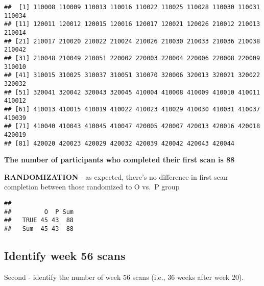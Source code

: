 \documentclass[]{article}
\newenvironment{Shaded}{\begin{snugshade}}{\end{snugshade}}
\newcommand{\KeywordTok}[1]{\textcolor[rgb]{0.13,0.29,0.53}{\textbf{#1}}}
\newcommand{\StringTok}[1]{\textcolor[rgb]{0.31,0.60,0.02}{#1}}
\newcommand{\CommentTok}[1]{\textcolor[rgb]{0.56,0.35,0.01}{\textit{#1}}}
\newcommand{\OperatorTok}[1]{\textcolor[rgb]{0.81,0.36,0.00}{\textbf{#1}}}
\newcommand{\NormalTok}[1]{#1}
\theoremstyle{definition}
\theoremstyle{definition}
\theoremstyle{definition}
\theoremstyle{remark}
\begin{document}
\begin{verbatim}
##  [1] 110008 110009 110013 110016 110022 110025 110028 110030 110031 110034
## [11] 120011 120012 120015 120016 120017 120021 120026 210012 210013 210014
## [21] 210017 210020 210022 210024 210026 210030 210033 210036 210038 210042
## [31] 210048 210049 210051 220002 220003 220004 220006 220008 220009 310010
## [41] 310015 310025 310037 310051 310070 320006 320013 320021 320022 320032
## [51] 320041 320042 320043 320045 410004 410008 410009 410010 410011 410012
## [61] 410013 410015 410019 410022 410023 410029 410030 410031 410037 410039
## [71] 410040 410043 410045 410047 420005 420007 420013 420016 420018 420019
## [81] 420020 420023 420029 420032 420039 420042 420043 420044
\end{verbatim}

\textbf{The number of participants who completed their first scan is 88}

\textbf{RANDOMIZATION} - as expected, there's no difference in first
scan completion between those randomized to O vs.~P group

\begin{Shaded}
\end{Shaded}

\begin{verbatim}
##       
##         O  P Sum
##   TRUE 45 43  88
##   Sum  45 43  88
\end{verbatim}

\subsection{Identify week 56 scans}\label{identify-week-56-scans}

Second - identify the number of week 56 scans (i.e., 36 weeks after week
20).
\end{document}
